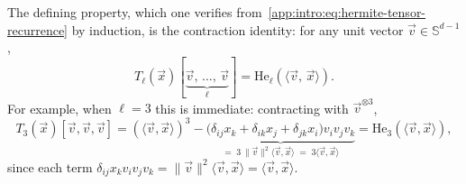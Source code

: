 The defining property, which one verifies from~\eqref{app:intro:eq:hermite-tensor-recurrence} by induction, is the contraction identity: for any unit vector \(\vec{v} \in \mathbb{S}^{d-1}\),
\begin{equation}\label{app:intro:eq:hermite-tensor-contraction}
    T_\ell(\vec{x})[\underbrace{\vec{v},\,\ldots,\,\vec{v}}_\ell] = \mathrm{He}_\ell(\langle \vec{v},\,\vec{x}\rangle).
\end{equation}
For example, when \(\ell = 3\) this is immediate: contracting with \(\vec{v}^{\otimes 3}\),
\[
    T_3(\vec{x})[\vec{v},\vec{v},\vec{v}]
    = (\langle\vec{v},\vec{x}\rangle)^3
      - \underbrace{\bigl(\delta_{ij}x_k + \delta_{ik}x_j + \delta_{jk}x_i\bigr)v_iv_jv_k}_{=\;3\,\|\vec{v}\|^2\langle\vec{v},\vec{x}\rangle\;=\;3\langle\vec{v},\vec{x}\rangle}
    = \mathrm{He}_3(\langle\vec{v},\vec{x}\rangle),
\]
since each term \(\delta_{ij}x_k v_iv_jv_k = \|\vec{v}\|^2\langle\vec{v},\vec{x}\rangle = \langle\vec{v},\vec{x}\rangle\).

